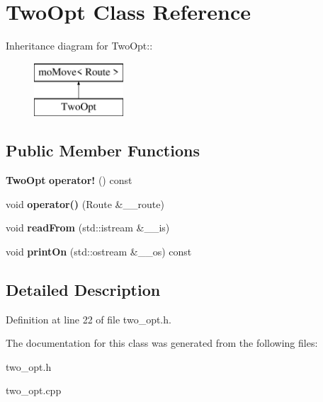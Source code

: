 \section{TwoOpt Class Reference}
\label{class_two_opt}
Inheritance diagram for TwoOpt::\begin{figure}[H]
\begin{center}
\leavevmode
\includegraphics[height=2cm]{class_two_opt}
\end{center}
\end{figure}
\subsection*{Public Member Functions}
\begin{CompactItemize}
\item 
{\bf TwoOpt} {\bf operator!} () const\label{class_two_opt_bc412d9f7fe3617cafef364f860d8d41}

\item 
void {\bf operator()} (Route \&\_\-\_\-route)\label{class_two_opt_ff87d1649a33d42a6d64e8d314ed1af0}

\item 
void {\bf readFrom} (std::istream \&\_\-\_\-is)\label{class_two_opt_feccfecca2a6bd2d3a12afdf3f724be0}

\item 
void {\bf printOn} (std::ostream \&\_\-\_\-os) const\label{class_two_opt_77ea59d81dd829ee3190219fa8659adc}

\end{CompactItemize}


\subsection{Detailed Description}




Definition at line 22 of file two\_\-opt.h.

The documentation for this class was generated from the following files:\begin{CompactItemize}
\item 
two\_\-opt.h\item 
two\_\-opt.cpp\end{CompactItemize}

